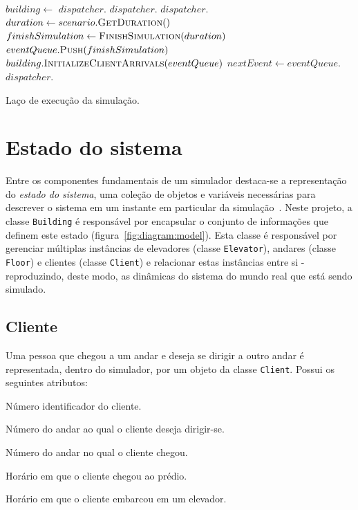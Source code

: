 \begin{algorithm}[H]
\begin{center}
\begin{algorithmic}[1]
  \State $building \leftarrow $
  \State
  \State $dispatcher.$
  \State $dispatcher.$
  \State $dispatcher.$
  \State
  \State $duration \leftarrow scenario.\Call{GetDuration}{}()$
  \State $finishSimulation \leftarrow \Call{FinishSimulation}{duration}$
  \State $eventQueue.\Call{Push}{finishSimulation}$
  \State
  \State $building.\Call{InitializeClientArrivals}{eventQueue}$
  \State
    \State $nextEvent \gets eventQueue.$
    \State $dispatcher.$
  \EndWhile
\EndFunction
\end{algorithmic}
\end{center}
\caption
   {\label{alg:sim}Laço de execução da simulação.}
\end{algorithm}

\section{Estado do sistema}

Entre os componentes fundamentais de um simulador destaca-se a representação do
\textit{estado do sistema}, uma coleção de objetos e variáveis necessárias para
descrever o sistema em um instante em particular da simulação~\cite{Law}. Neste
projeto, a classe \texttt{Building} é responsável por encapsular o conjunto de
informações que definem este estado (figura~\ref{fig:diagram:model}). Esta
classe é responsável por gerenciar múltiplas instâncias de elevadores (classe
\texttt{Elevator}), andares (classe \texttt{Floor}) e clientes (classe
\texttt{Client}) e relacionar estas instâncias entre si - reproduzindo, deste
modo, as dinâmicas do sistema do mundo real que está sendo simulado.

\subsection{Cliente}
  Uma pessoa que chegou a um andar e deseja se dirigir a outro andar é
  representada, dentro do simulador, por um objeto da classe \texttt{Client}.
  Possui os seguintes atributos:

  \begin{description}[leftmargin=!,labelwidth=\widthof{\bfseries arrivalFloor}]
    \item[\texttt{id}] Número identificador do cliente.
    \item[\texttt{destination}] Número do andar ao qual o cliente deseja dirigir-se.
    \item[\texttt{arrivalFloor}] Número do andar no qual o cliente chegou.
    \item[\texttt{createTime}] Horário em que o cliente chegou ao prédio.
    \item[\texttt{pickupTime}] Horário em que o cliente embarcou em um elevador.
  \end{description}

